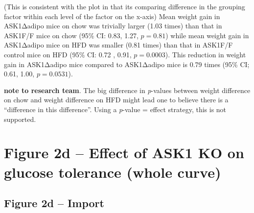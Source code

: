 \documentclass[]{book}
\begin{document}
(This is consistent with the plot in that its comparing difference in the grouping factor within each level of the factor on the x-axis) Mean weight gain in ASK1Δadipo mice on chow was trivially larger (1.03 times) than that in ASK1F/F mice on chow (95\% CI: 0.83, 1.27, \(p = 0.81\)) while mean weight gain in ASK1Δadipo mice on HFD was smaller (0.81 times) than that in ASK1F/F control mice on HFD (95\% CI: 0.72 , 0.91, \(p = 0.0003\)). This reduction in weight gain in ASK1Δadipo mice compared to ASK1Δadipo mice is 0.79 times (95\% CI; 0.61, 1.00, \(p = 0.0531\)).

\textbf{note to research team}. The big difference in \emph{p}-values between weight difference on chow and weight difference on HFD might lead one to believe there is a ``difference in this difference''. Using a \emph{p}-value = effect strategy, this is not supported.

\hypertarget{figure-2d-effect-of-ask1-ko-on-glucose-tolerance-whole-curve}{%
\section{Figure 2d -- Effect of ASK1 KO on glucose tolerance (whole curve)}\label{figure-2d-effect-of-ask1-ko-on-glucose-tolerance-whole-curve}}

\hypertarget{figure-2d-import}{%
\subsection{Figure 2d -- Import}\label{figure-2d-import}}
\end{document}
